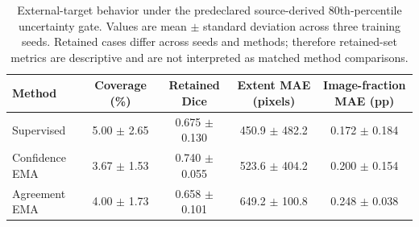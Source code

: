
\begin{table}[t]
\centering
\caption{External-target behavior under the predeclared source-derived
80th-percentile uncertainty gate. Values are mean $\pm$ standard deviation
across three training seeds. Retained cases differ across seeds and methods;
therefore retained-set metrics are descriptive and are not interpreted as
matched method comparisons.}
\label{tab:nb10_source_p80}
\begin{tabular}{lcccc}
\toprule
Method &
Coverage (\%) &
Retained Dice &
Extent MAE (pixels) &
Image-fraction MAE (pp) \\
\midrule
Supervised & 5.00 $\pm$ 2.65 & 0.675 $\pm$ 0.130 & 450.9 $\pm$ 482.2 & 0.172 $\pm$ 0.184 \\
Confidence EMA & 3.67 $\pm$ 1.53 & 0.740 $\pm$ 0.055 & 523.6 $\pm$ 404.2 & 0.200 $\pm$ 0.154 \\
Agreement EMA & 4.00 $\pm$ 1.73 & 0.658 $\pm$ 0.101 & 649.2 $\pm$ 100.8 & 0.248 $\pm$ 0.038 \\
\bottomrule
\end{tabular}
\end{table}
